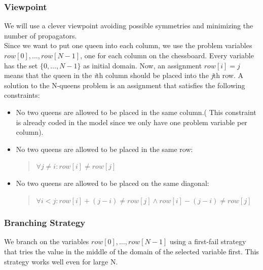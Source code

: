 \documentclass[a4paper]{scrartcl}
\begin{document}
\subsubsection{Viewpoint}
We will use a clever viewpoint avoiding possible symmetries and minimizing 
the number of propagators.\\

Since we want to put one queen into each column, we use the problem
variables $ row[ 0 ], \ldots, row[ N - 1 ]$, one for each column on
the chessboard. Every variable has the set $ \{ 0, \ldots, N - 1 \} $
as initial domain. Now, an assignment $ row[ i ] = j $ means that the
queen in the {\it i}th column should be placed into the {\it j}th row.
A solution to the N-queens problem is an assignment that satisfies the
following constraints:
\begin{itemize}
\item
No two queens are allowed to be placed in the same column.( This constraint
is already coded in the model since we only have one problem variable
per column).
\item
No two queens are allowed to be placed in the same row:
\begin{quote}
$ \forall j \neq i : row[ i ] \neq row[ j ] $
\end{quote}
\item
No two queens are allowed to be placed on the same diagonal:
\begin{quote}
$ \forall i < j : row[ i ] + (j - i) \neq row[ j ] \wedge  row[ i ] - (j - i) \neq row[ j ] $
\end{quote}
\end{itemize}

\subsubsection{Branching Strategy}
We branch on the variables $ row[ 0 ], \ldots, row[ N - 1 ]$ using a 
first-fail strategy that tries the value in the middle of the domain of 
the selected variable first. This strategy works well even for large N. 
\end{document}
